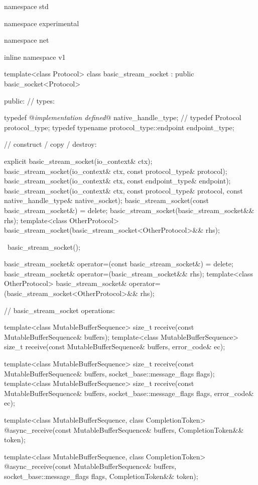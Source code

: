 \begin{codeblock}
namespace std {
namespace experimental {
namespace net {
inline namespace v1 {

  template<class Protocol>
  class basic_stream_socket : public basic_socket<Protocol>
  {
  public:
    // types:

    typedef @\textit{implementation defined}@ native_handle_type; // \nativeref
    typedef Protocol protocol_type;
    typedef typename protocol_type::endpoint endpoint_type;

    // construct / copy / destroy:

    explicit basic_stream_socket(io_context& ctx);
    basic_stream_socket(io_context& ctx, const protocol_type& protocol);
    basic_stream_socket(io_context& ctx, const endpoint_type& endpoint);
    basic_stream_socket(io_context& ctx, const protocol_type& protocol,
                        const native_handle_type& native_socket);
    basic_stream_socket(const basic_stream_socket&) = delete;
    basic_stream_socket(basic_stream_socket&& rhs);
    template<class OtherProtocol>
      basic_stream_socket(basic_stream_socket<OtherProtocol>&& rhs);

    ~basic_stream_socket();

    basic_stream_socket& operator=(const basic_stream_socket&) = delete;
    basic_stream_socket& operator=(basic_stream_socket&& rhs);
    template<class OtherProtocol>
      basic_stream_socket& operator=(basic_stream_socket<OtherProtocol>&& rhs);

    // basic_stream_socket operations:

    template<class MutableBufferSequence>
      size_t receive(const MutableBufferSequence& buffers);
    template<class MutableBufferSequence>
      size_t receive(const MutableBufferSequence& buffers,
                     error_code& ec);

    template<class MutableBufferSequence>
      size_t receive(const MutableBufferSequence& buffers,
                     socket_base::message_flags flags);
    template<class MutableBufferSequence>
      size_t receive(const MutableBufferSequence& buffers,
                     socket_base::message_flags flags, error_code& ec);

    template<class MutableBufferSequence, class CompletionToken>
      @\DEDUCED@ async_receive(const MutableBufferSequence& buffers,
                            CompletionToken&& token);

    template<class MutableBufferSequence, class CompletionToken>
      @\DEDUCED@ async_receive(const MutableBufferSequence& buffers,
                            socket_base::message_flags flags,
                            CompletionToken&& token);

}}}}}
\end{codeblock}
